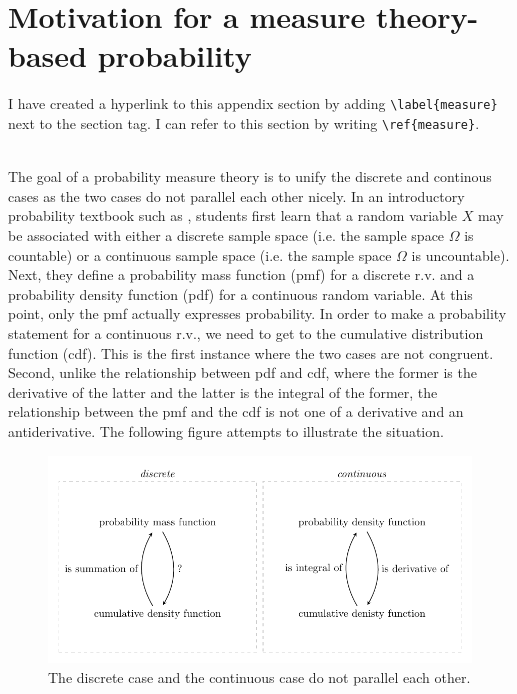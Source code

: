 \documentclass[12pt, notitlepage]{article}
\begin{document}
\section{Motivation for a measure theory-based probability} \label{measure}

\begin{notes}
I have created a hyperlink to this appendix section by adding \verb|\label{measure}| next to the section tag. I can refer to this section by writing \verb|\ref{measure}|. 
\end{notes}
\\

The goal of a probability measure theory is to unify the discrete and continous cases as the two cases do not parallel each other nicely. In an introductory probability textbook such as \cite{ross}, students first learn that a random variable $X$ may be associated with either a discrete sample space (i.e. the sample space $\Omega$ is countable) or a continuous sample space (i.e. the sample space $\Omega$ is uncountable). Next, they define a probability mass function (pmf) for a discrete r.v. and a probability density function (pdf) for a continuous random variable. At this point, only the pmf actually expresses probability. In order to make a probability statement for a continuous r.v., we need to get to the cumulative distribution function (cdf). This is the first instance where the two cases are not congruent. Second, unlike the relationship between pdf and cdf, where the former is the derivative of the latter and the latter is the integral of the former, the relationship between the pmf and the cdf is not one of a derivative and an antiderivative. The following figure attempts to illustrate the situation. 

\begin{figure}[h!]
\center
\caption{The discrete case and the continuous case do not parallel each other.}
\includegraphics{fig/tikz_graph.pdf}
\end{figure}
\end{document}
